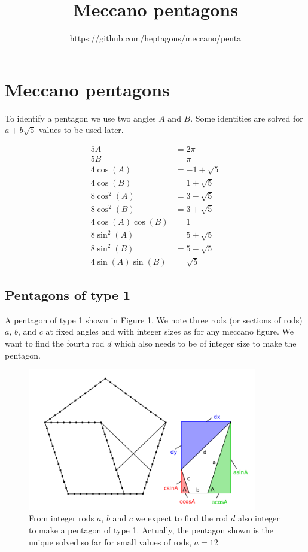 \documentclass[11pt]{article}
\title{\textbf{Meccano pentagons}}
\author{https://github.com/heptagons/meccano/penta}
\date{}
\begin{document}
\maketitle

\section{Meccano pentagons}

To identify a pentagon we use two angles $A$ and $B$. Some identities are solved for $a + b\sqrt{5}$ values to be used later.

\begin{align*}
5A &= {2\pi} \\
5B &= {\pi} \\
4\cos(A) &=  -1 + \sqrt{5} \\
4\cos(B) &=   1 + \sqrt{5} \\
8\cos^2(A) &= { 3 - \sqrt{5}} \\
8\cos^2(B) &= { 3 + \sqrt{5}} \\
4\cos(A)\cos(B) &= 1 \\
8\sin^2(A) &= 5 + \sqrt{5} \\
8\sin^2(B) &= 5 - \sqrt{5} \\
4\sin(A)\sin(B) &= \sqrt{5}
\end{align*}

\subsection{Pentagons of type 1}
A pentagon of type 1 shown in Figure \ref{pentagon-type-1}. We note three rods (or sections of rods) $a$, $b$, and $c$ at fixed angles and with integer sizes as for any meccano figure. We want to find the fourth rod $d$ which also needs to be of integer size to make the pentagon.

\begin{figure}
\centering
\includegraphics[width=10cm]{figs/pentagon-type-1}
\caption{From integer rods $a$, $b$ and $c$ we expect to find the rod $d$ also integer to make a pentagon of type 1. Actually, the pentagon shown is the unique solved so far for small values of rods, $a=12$}
\label{pentagon-type-1}
\end{figure}
\end{document}
